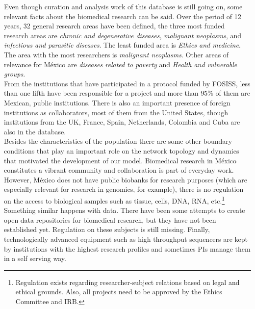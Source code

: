\documentclass{bmcart}
\begin{document}
Even though curation and analysis work of this database is still going on, some
relevant facts about the biomedical research can be said. Over the period of 12
years, 32 general research areas have been defined, the three most funded
research areas are \emph{chronic and degenerative diseases}, \emph{malignant
  neoplasms}, and \emph{infectious and parasitic diseases}. The least funded
area is \emph{Ethics and medicine}. The area with the most researchers is
\emph{malignant neoplasms}. Other areas of relevance for M\'exico are
\emph{diseases related to poverty} and \emph{Health and vulnerable groups}. \\  

From the institutions that have participated in a protocol funded by FOSISS,
less than one fifth have been responsible for a project and more than 95\% of
them are Mexican, public institutions. There is also an important presence of
foreign institutions as collaborators, most of them from the United States,
though institutions from the UK, France, Spain, Netherlands, Colombia and Cuba
are also in the database.\\ 

Besides the characteristics of the population there are some other boundary
conditions that play an important role on the network topology and dynamics
that motivated the development of our model. Biomedical research in M\'exico
constitutes a vibrant community and collaboration is part of everyday
work. However, M\'exico does not have public biobanks for research purposes
(which are especially relevant for research in genomics, for example), there is
no regulation on the access to biological samples such as tissue, cells, DNA,
RNA, etc.\footnote{Regulation exists regarding researcher-subject relations
  based on legal and ethical grounds. Also, all projects need to be approved by
  the Ethics Committee and IRB.} Something similar happens with data. There have
been some attempts to create open data repositories for biomedical research, but
they have not been established yet. Regulation on these subjects is still
missing. Finally, technologically advanced equipment such as high throughput sequencers
are kept by institutions with the highest research
profiles and sometimes PIs manage them in a self serving way.\\  
\end{document}
